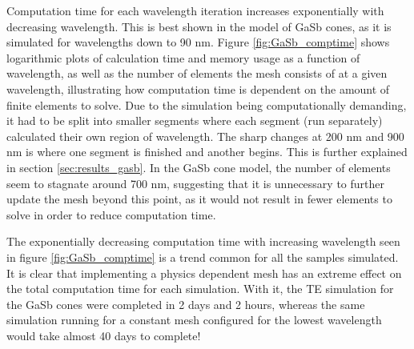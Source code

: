 Computation time for each wavelength iteration increases exponentially with decreasing wavelength. This is best shown in the model of GaSb cones, as it is simulated for wavelengths down to 90 nm. Figure \ref{fig:GaSb_comptime} shows logarithmic plots of calculation time and memory usage as a function of wavelength, as well as the number of elements the mesh consists of at a given wavelength, illustrating how computation time is dependent on the amount of finite elements to solve. Due to the simulation being computationally demanding, it had to be split into smaller segments where each segment (run separately) calculated their own region of wavelength. The sharp changes at 200 nm and 900 nm is where one segment is finished and another begins. This is further explained in section \ref{sec:results_gasb}. In the GaSb cone model, the number of elements seem to stagnate around 700 nm, suggesting that it is unnecessary to further update the mesh beyond this point, as it would not result in fewer elements to solve in order to reduce computation time.

The exponentially decreasing computation time with increasing wavelength seen in figure \ref{fig:GaSb_comptime} is a trend common for all the samples simulated. It is clear that implementing a physics dependent mesh has an extreme effect on the total computation time for each simulation. With it, the TE simulation for the GaSb cones were completed in 2 days and 2 hours, whereas the same simulation running for a constant mesh configured for the lowest wavelength would take almost 40 days to complete!




